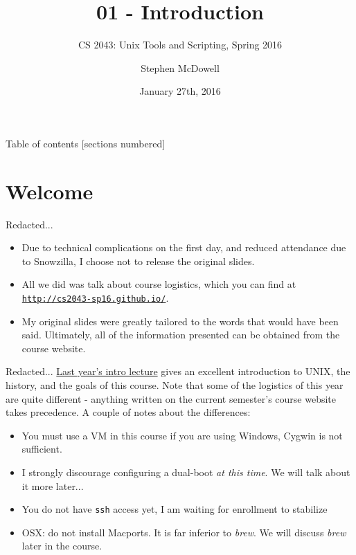 \documentclass[11pt]{beamer}
\title{01 \-- Introduction}
\subtitle{CS 2043: Unix Tools and Scripting, Spring 2016 \cite{prevSemesters}}
\date{January 27th, 2016}
\author{Stephen McDowell}
\institute{Cornell University}
\newcommand{\colbf}[1]{\textcolor{mLightBrown!77!black}{#1}}%
\begin{document}
\maketitle

\begin{frame}{Table of contents}
  [sections numbered]
  \tableofcontents[hideallsubsections]
\end{frame}

%
\section{Welcome}
\label{sec:welcome}

\begin{frame}{Redacted...}
  \begin{itemize}
    \item Due to technical complications on the first day, and reduced attendance due to Snowzilla,  I choose
          not to release the original slides.
    \item All we did was talk about course logistics, which you can find at
          \href{http://cs2043-sp16.github.io/}{\texttt{\colbf{http://cs2043-sp16.github.io/}}}.
    \item My original slides were greatly tailored to the words that would have been said.  Ultimately, all of
          the information presented can be obtained from the course website.
  \end{itemize}
\end{frame}

\begin{frame}{Redacted...}
  \href{http://www.cs.cornell.edu/courses/cs2043/2015sp/lectures/lecture01.pdf}{\colbf{Last year's intro lecture}}
  gives an excellent introduction to UNIX, the history, and the goals of this course. Note that some of the
  logistics of this year are quite different \-- anything written on the current semester's course website
  takes precedence.  A couple of notes about the differences:

  \begin{itemize}
    \item You must use a VM in this course if you are using Windows, Cygwin is not sufficient.
    \item I strongly discourage configuring a dual-boot \emph{at this time}.  We will talk about it more later...
    \item You do not have \texttt{ssh} access yet, I am waiting for enrollment to stabilize
    \item OSX: do \colbf{not} install Macports.  It is far inferior to \emph{brew}.  We will discuss \emph{brew}
          later in the course.
  \end{itemize}
\end{frame}
\end{document}
